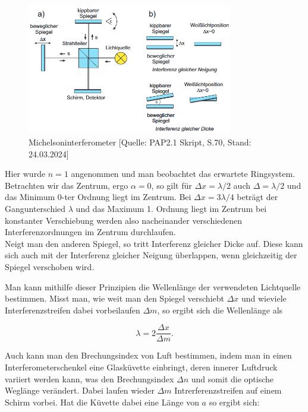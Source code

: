 \documentclass{article}
\begin{document}
\begin{figure}[!b]
    \centering
    \includegraphics[width=0.8\textwidth]{graphics/skript/interferometer.png}
    \caption{Michelsoninterferometer [Quelle: PAP2.1 Skript, S.70, Stand: 24.03.2024]}
    \label{fig:Michelsoninterferometer}
\end{figure}

Hier wurde $n=1$ angenommen und man beobachtet das erwartete Ringsystem. Betrachten wir das Zentrum, ergo $\alpha = 0$, so gilt für $\Delta x = \lambda / 2$ auch $\Delta = \lambda / 2$ und das Minimum 0-ter Ordnung liegt im Zentrum. Bei $\Delta x = 3\lambda / 4$ beträgt der Gangunterschied $\lambda$ und das Maximum 1. Ordnung liegt im Zentrum bei konstanter Verschiebung werden also nacheinander verschiedenen Interferenzordnungen im Zentrum durchlaufen.  \\
Neigt man den anderen Spiegel, so tritt Interferenz gleicher Dicke auf. Diese kann sich auch mit der Interferenz gleicher Neigung überlappen, wenn gleichzeitig der Spiegel verschoben wird. 

\newpage
Man kann mithilfe dieser Prinzipien die Wellenlänge der verwendeten Lichtquelle bestimmen. Misst man, wie weit man den Spiegel verschiebt $\Delta x$ und wieviele Interferenzstreifen dabei vorbeilaufen $\Delta m$, so ergibt sich die Wellenlänge als

\begin{equation}
    \lambda = 2 \frac{\Delta x}{\Delta m}.
    \label{eq:1_WELLENLÄNGE_A1}
\end{equation}

Auch kann man den Brechungsindex von Luft bestimmen, indem man in einen Interferometerschenkel eine Glasküvette einbringt, deren innerer Luftdruck variiert werden kann, was den Brechungsindex $\Delta n$ und somit die optische Weglänge verändert. Dabei laufen wieder $\Delta m$ Intrerferenzstreifen auf einem Schirm vorbei. Hat die Küvette dabei eine Länge von $a$ so ergibt sich:
\end{document}
